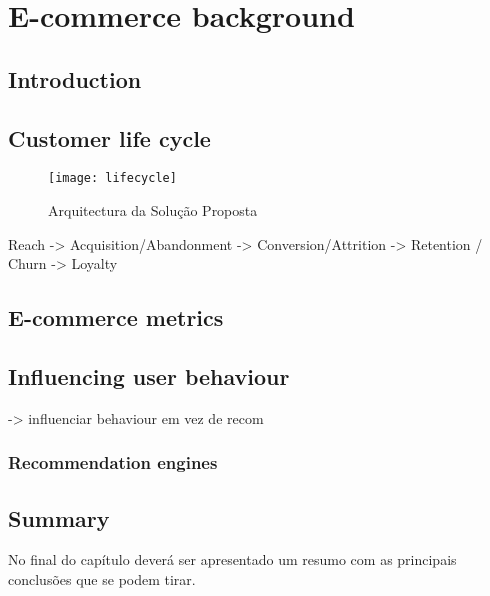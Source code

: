 \chapter{E-commerce background} \label{chap:ecommerce}

\section*{}



\section{Introduction}


\section{Customer life cycle}

\begin{figure}[t]
  \begin{center}
    \leavevmode
    \texttt{[image: lifecycle]}
    \caption{Arquitectura da Solução Proposta}
    \label{fig:lifecycle}
  \end{center}
\end{figure}

Reach -> Acquisition/Abandonment -> Conversion/Attrition -> Retention / Churn -> Loyalty

\section{E-commerce metrics}

\cite{Sterne2000}

\section{Influencing user behaviour}

-> influenciar behaviour em vez de recom

\subsection{Recommendation engines}

\cite{Adomavicius2005}

\section{Summary}

No final do capítulo deverá ser apresentado um resumo com as 
principais conclusões que se podem tirar. 
